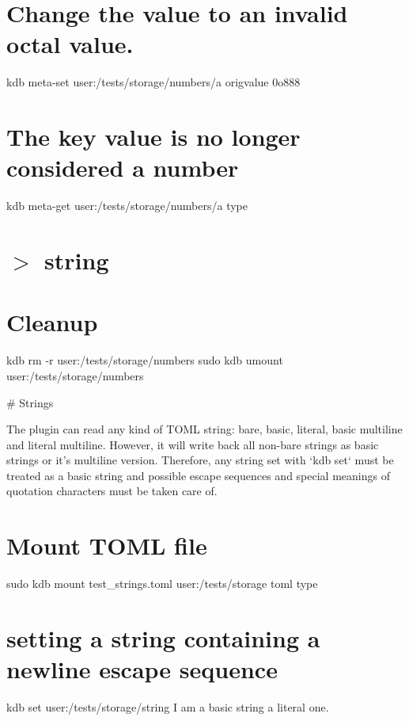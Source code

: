 \hypertarget{autotoc_md635_autotoc_md679}{}\section{Change the value to an invalid octal value.}\label{autotoc_md635_autotoc_md679}
kdb meta-\/set \textquotesingle{}user\+:/tests/storage/numbers/a\textquotesingle{} \textquotesingle{}origvalue\textquotesingle{} \textquotesingle{}0o888\textquotesingle{}\hypertarget{autotoc_md635_autotoc_md680}{}\section{The key value is no longer considered a number}\label{autotoc_md635_autotoc_md680}
kdb meta-\/get \textquotesingle{}user\+:/tests/storage/numbers/a\textquotesingle{} \textquotesingle{}type\textquotesingle{} \hypertarget{autotoc_md635_autotoc_md681}{}\section{$>$ string}\label{autotoc_md635_autotoc_md681}
\hypertarget{autotoc_md635_autotoc_md682}{}\section{Cleanup}\label{autotoc_md635_autotoc_md682}
kdb rm -\/r user\+:/tests/storage/numbers sudo kdb umount user\+:/tests/storage/numbers 
\begin{DoxyCode}
# Strings

The plugin can read any kind of TOML string: bare, basic, literal, basic multiline and literal multiline.
However, it will write back all non-bare strings as basic strings or it's multiline version.
Therefore, any string set with `kdb set` must be treated as a basic string and possible escape sequences
       and special meanings of quotation characters must be taken care of.
\end{DoxyCode}
 \hypertarget{autotoc_md635_autotoc_md683}{}\section{Mount T\+O\+M\+L file}\label{autotoc_md635_autotoc_md683}
sudo kdb mount test\+\_\+strings.\+toml user\+:/tests/storage toml type\hypertarget{autotoc_md635_autotoc_md684}{}\section{setting a string containing a newline escape sequence}\label{autotoc_md635_autotoc_md684}
kdb set \textquotesingle{}user\+:/tests/storage/string\textquotesingle{} \textquotesingle{}I am a basic string a literal one.\textquotesingle{}

